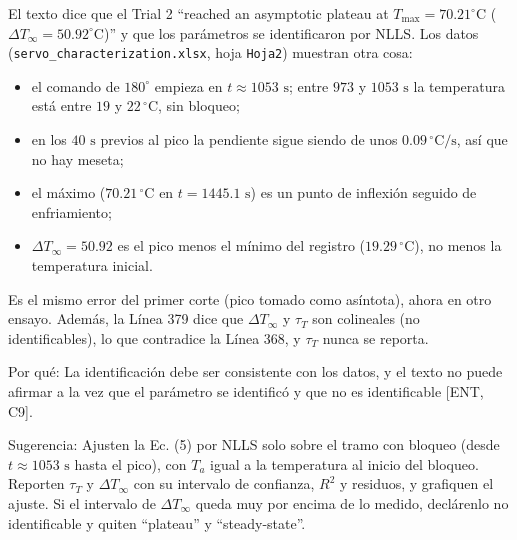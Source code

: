 \documentclass{LabDSTresponse}
\begin{document}
{El texto dice que el Trial 2 “reached an asymptotic plateau at $T_{\max} = 70.21^\circ\text{C}$ ($\Delta T_\infty = 50.92^\circ\text{C}$)” y que los parámetros se identificaron por NLLS. Los datos (\texttt{servo\_characterization.xlsx}, hoja \texttt{Hoja2}) muestran otra cosa:
\begin{itemize}
    \item el comando de $180^\circ$ empieza en $t \approx 1053\text{ s}$; entre $973$ y $1053\text{ s}$ la temperatura está entre $19$ y $22\,^\circ\text{C}$, sin bloqueo;
    \item en los $40\text{ s}$ previos al pico la pendiente sigue siendo de unos $0.09\,^\circ\text{C/s}$, así que no hay meseta;
    \item el máximo ($70.21\,^\circ\text{C}$ en $t = 1445.1\text{ s}$) es un punto de inflexión seguido de enfriamiento;
    \item $\Delta T_\infty = 50.92$ es el pico menos el mínimo del registro ($19.29\,^\circ\text{C}$), no menos la temperatura inicial.
\end{itemize}
Es el mismo error del primer corte (pico tomado como asíntota), ahora en otro ensayo. Además, la Línea 379 dice que $\Delta T_\infty$ y $\tau_T$ son colineales (no identificables), lo que contradice la Línea 368, y $\tau_T$ nunca se reporta.

Por qué: La identificación debe ser consistente con los datos, y el texto no puede afirmar a la vez que el parámetro se identificó y que no es identificable [ENT, C9].

Sugerencia: Ajusten la Ec. (5) por NLLS solo sobre el tramo con bloqueo (desde $t \approx 1053\text{ s}$ hasta el pico), con $T_a$ igual a la temperatura al inicio del bloqueo. Reporten $\tau_T$ y $\Delta T_\infty$ con su intervalo de confianza, $R^2$ y residuos, y grafiquen el ajuste. Si el intervalo de $\Delta T_\infty$ queda muy por encima de lo medido, declárenlo no identificable y quiten “plateau” y “steady-state”.}
\end{document}
